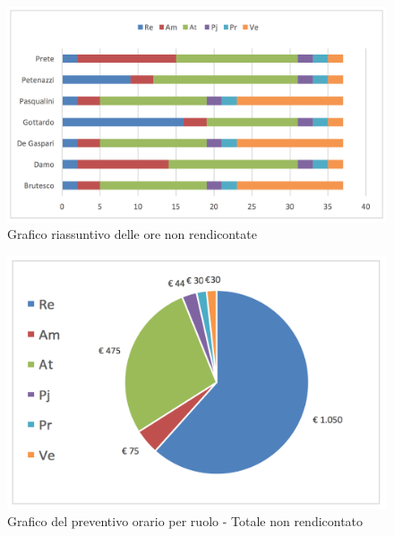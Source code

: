 							\begin{figure}[H]  \centering
							\includegraphics[width=\textwidth]{img/h_NonRend}
							\caption{Grafico riassuntivo delle ore non rendicontate}
							\label{fig:h_non_rend"} 		\end{figure}
			\begin{figure}[H]
			\centering
			\includegraphics[scale=0.40]{img/h_r_TotaleNonRendicontato}
			\caption{Grafico del preventivo orario per ruolo - Totale non rendicontato}
			\label{fig:Totale non rendicontato"}
			\end{figure}
